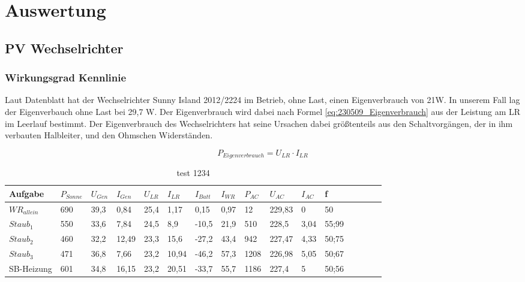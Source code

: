 \section{Auswertung}
\subsection{PV Wechselrichter}
\subsubsection{Wirkungsgrad Kennlinie}
Laut Datenblatt hat der Wechselrichter Sunny Island 2012/2224 im Betrieb, ohne Last, einen Eigenverbrauch von 21W. 
In unserem Fall lag der Eigenverbauch ohne Last bei 29,7 W. 
Der Eigenverbrauch wird dabei nach Formel \autoref{eq:230509_Eigenverbrauch} aus der Leistung am LR im Leerlauf bestimmt. 
Der Eigenverbrauch des Wechselrichters hat seine Ursachen dabei größtenteils aus den Schaltvorgängen, der in ihm verbauten Halbleiter, und den Ohmschen Widerständen.

\begin{equation}
	P_{ Eigenverbrauch }= U_{ LR} \cdot I_{ LR }
\label{eq:230509_Eigenverbrauch}
\end{equation} 


\begin{table}[!ht]
    \caption{test 1234}
	\centering
    \begin{tabular}{|l|l|l|l|l|l|l|l|l|l|l|l|l|l|l|l|}
    \hline
        Aufgabe & $P_{Sonne}$ & $U_{Gen}$ & $I_{Gen}$ & $U_{LR}$ & $I_{LR}$ & $I_{Batt}$ & $I_{WR}$ & $P_{AC}$ & $U_{AC}$ & $I_{AC}$ & f \\ \hline
        ${WR}_{allein}$ & 690 & 39,3 & 0,84 & 25,4 & 1,17 & 0,15 & 0,97 & 12 & 229,83 & 0 & 50 \\ \hline
        $Staub_{1}$ & 550 & 33,6 & 7,84 & 24,5 & 8,9 & -10,5 & 21,9 & 510 & 228,5 & 3,04 & 55;99  \\ \hline
        $Staub_{2}$ & 460 & 32,2 & 12,49 & 23,3 & 15,6 & -27,2 & 43,4 & 942 & 227,47 & 4,33 & 50;75 \\ \hline
        $Staub_{3}$ & 471 & 36,8 & 7,66 & 23,2 & 10,94 & -46,2 & 57,3 & 1208 & 226,98 & 5,05 & 50;67 \\ \hline
        SB-Heizung & 601 & 34,8 & 16,15 & 23,2 & 20,51 & -33,7 & 55,7 & 1186 & 227,4 & 5 & 50;56 \\ \hline
    \end{tabular}
	\label{tab:230512_Messtabelle}
\end{table}

